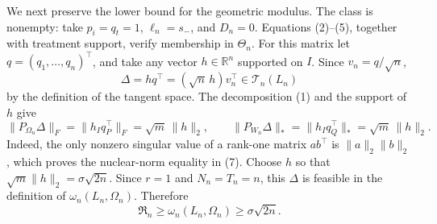 We next preserve the lower bound for the geometric modulus.  The class is nonempty: take \(p_i=q_t=1\), \(\ell_n=s_-\), and \(D_n=0\).  Equations (2)--(5), together with treatment support, verify membership in \(\Theta_n\).  For this matrix let \(q=(q_1,\ldots,q_n)^{\top}\), and take any vector \(h\in\mathbb R^n\) supported on \(I\).  Since \(v_n=q/\sqrt n\),
\[
\Delta=hq^{\top}=(\sqrt n\,h)v_n^{\top}\in\mathcal T_n(L_n)          \tag{6}
\]
by the definition of the tangent space.  The decomposition (1) and the support of \(h\) give
\[
\lVert P_{\Omega_n}\Delta\rVert_F
=\lVert h_Iq_P^{\top}\rVert_F
=\sqrt m\,\lVert h\rVert_2,
\qquad
\lVert P_{W_n}\Delta\rVert_*
=\lVert h_Iq_Q^{\top}\rVert_*
=\sqrt m\,\lVert h\rVert_2.                              \tag{7}
\]
Indeed, the only nonzero singular value of a rank-one matrix \(ab^{\top}\) is
\(\lVert a\rVert_2\lVert b\rVert_2\), which proves the nuclear-norm equality in (7).  Choose \(h\) so that \(\sqrt m\lVert h\rVert_2=\sigma\sqrt{2n}\).  Since \(r=1\) and \(N_n=T_n=n\), this \(\Delta\) is feasible in the definition of \(\omega_n(L_n,\Omega_n)\).  Therefore
\[
\mathfrak R_n\ge \omega_n(L_n,\Omega_n)
\ge\sigma\sqrt{2n}.                                      \tag{8}
\]

